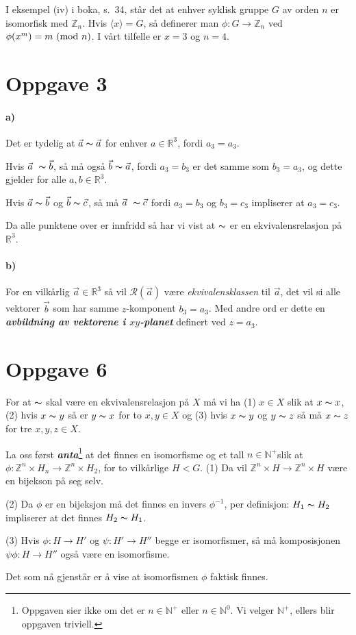 \documentclass[a4paper,norsk,twocolumn,10pt]{article}
\begin{document}
I eksempel (iv) i boka, s.~34, står det at enhver syklisk gruppe $G$ av orden
$n$ er isomorfisk med $\mathbb{Z}_n$. Hvis $\langle x \rangle = G$, så
definerer man $\phi\colon G \rightarrow \mathbb{Z}_n$ ved $\phi{(x^m)} = m
\ (\text{mod}\ n)$. I vårt tilfelle er $x=3$ og $n=4$.

\section*{Oppgave 3}
\paragraph{\textbf{a)}}
Det er tydelig at $\vec{a} \thicksim \vec{a}$ for enhver $a\in \mathbb{R}^3$,
fordi $a_3=a_3$.

Hvis $\vec{a} \thicksim \vec{b}$, så må også $\vec{b} \thicksim \vec{a}$, fordi
$a_3=b_3$ er det samme som $b_3=a_3$, og dette gjelder for alle $a,b \in
\mathbb{R}^3$.

Hvis $\vec{a} \thicksim \vec{b}$ og $\vec{b} \thicksim \vec{c}$, så må
$\vec{a} \thicksim \vec{c}$ fordi $a_3=b_3$ og $b_3=c_3$ impliserer at
$a_3=c_3$.

Da alle punktene over er innfridd så har vi vist at $\thicksim$ er en
ekvivalensrelasjon på $\mathbb{R}^3$.

\paragraph{\textbf{b)}}
For en vilkårlig $\vec{a} \in \mathbb{R}^3$ så vil $\mathscr{R}(\vec{a})$ være
\textit{ekvivalensklassen} til $\vec{a}$, det vil si alle vektorer $\vec{b}$
som har samme $z$-komponent $b_3=a_3$. Med andre ord er dette en
\textbf{\textit{avbildning av vektorene i $xy$-planet}}
definert ved $z=a_3$.

\section*{Oppgave 6}
For at $\thicksim$ skal være en ekvivalensrelasjon på $X$ må vi ha (1) $x\in X$
slik at $x \thicksim x$, (2) hvis $x \thicksim y$ så er $y \thicksim x$ for to
$x,y \in X$ og (3) hvis $x \thicksim y$ og $y \thicksim z$ så må $x \thicksim
z$ for tre $x,y,z \in X$.

La oss først \textbf{\textit{anta}}\footnote{Oppgaven sier ikke om det er $n
\in \mathbb{N}^+$ eller $n \in \mathbb{N}^0$. Vi velger $\mathbb{N}^+$, ellers
blir oppgaven triviell.} at det finnes en isomorfisme og et tall $n \in
\mathbb{N}^+$slik at $\phi\colon \mathbb{Z}^n \times H_n \rightarrow
\mathbb{Z}^n \times H_2$, for to vilkårlige $H<G$.  (1) Da vil $\mathbb{Z}^n
\times H \rightarrow \mathbb{Z}^n \times H$ være en bijekson på seg selv.

(2) Da $\phi$ er en bijeksjon må det finnes en invers $\phi^{-1}$, per
definisjon: $H_1 \thicksim H_2$ impliserer at det finnes $H_2 \thicksim H_1$.

(3) Hvis $\phi\colon H \rightarrow H'$ og $\psi\colon H' \rightarrow H''$ begge
er isomorfismer, så må komposisjonen $\psi\phi\colon H \rightarrow H''$ også
være en isomorfisme.

Det som nå gjenstår er å vise at isomorfismen $\phi$ faktisk finnes.
\end{document}
